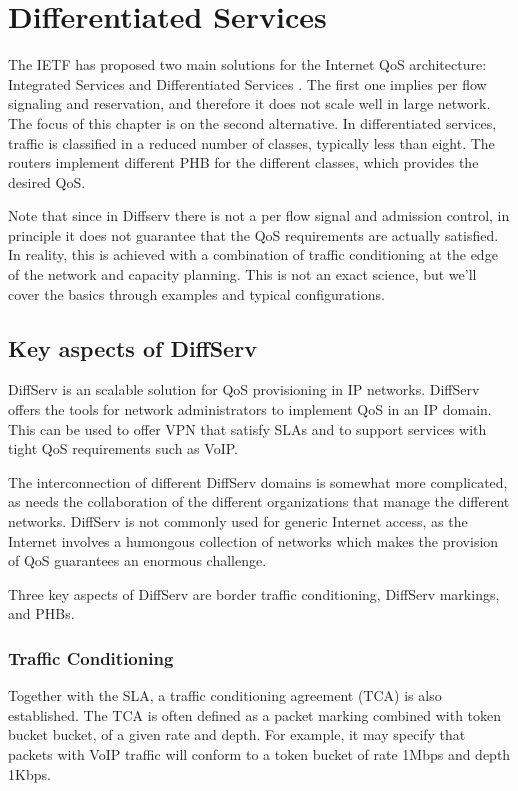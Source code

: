 \chapter{Differentiated Services}

The IETF has proposed two main solutions for the Internet QoS architecture: Integrated Services and Differentiated Services \cite{rfc2475}.
The first one implies per flow signaling and reservation, and therefore it does not scale well in large network.
The focus of this chapter is on the second alternative.
In differentiated services, traffic is classified in a reduced number of classes, typically less than eight.
The routers implement different PHB for the different classes, which provides the desired QoS.

Note that since in Diffserv there is not a per flow signal and admission control, in principle it does not guarantee that the QoS requirements are actually satisfied.
In reality, this is achieved with a combination of traffic conditioning at the edge of the network and capacity planning.
This is not an exact science, but we'll cover the basics through examples and typical configurations.

\section{Key aspects of DiffServ}
DiffServ is an scalable solution for QoS provisioning in IP networks.
DiffServ offers the tools for network administrators to implement QoS in an IP domain.
This can be used to offer VPN that satisfy SLAs and to support services with tight QoS requirements such as VoIP.

The interconnection of different DiffServ domains is somewhat more complicated, as needs the collaboration of the different organizations that manage the different networks.
DiffServ is not commonly used for generic Internet access, as the Internet involves a humongous collection of networks which makes the provision of QoS guarantees an enormous challenge.

Three key aspects of DiffServ are border traffic conditioning, DiffServ markings, and PHBs.

\subsection{Traffic Conditioning}

Together with the SLA, a traffic conditioning agreement (TCA) is also established.
The TCA is often defined as a packet marking combined with token bucket bucket, of a given rate and depth.
For example, it may specify that packets with VoIP traffic will conform to a token bucket of rate 1Mbps and depth 1Kbps.

